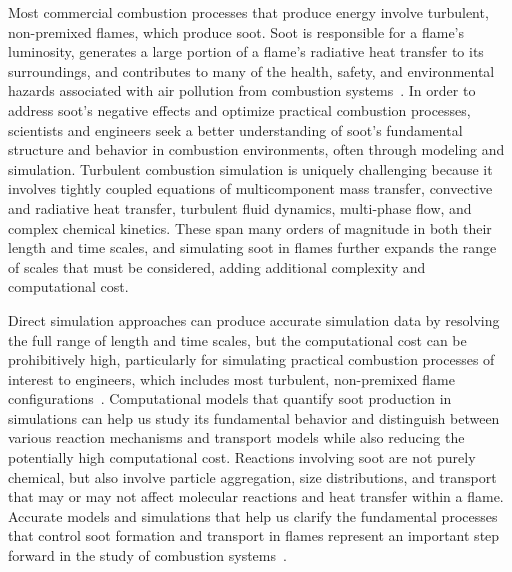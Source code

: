 \documentclass[preprint,letterpaper]{elsarticle}
\begin{document}
Most commercial combustion processes that produce energy involve turbulent, non-premixed flames, which produce soot. Soot is responsible for a flame's luminosity, generates a large portion of a flame's radiative heat transfer to its surroundings, and contributes to many of the health, safety, and environmental hazards associated with air pollution from combustion systems~\cite{EPA_2009,EPA_2004}. In order to address soot's negative effects and optimize practical combustion processes, scientists and engineers seek a better understanding of soot's fundamental structure and behavior in combustion environments, often through modeling and simulation.
Turbulent combustion simulation is uniquely challenging because it involves tightly coupled equations of multicomponent mass transfer, convective and radiative heat transfer, turbulent fluid dynamics, multi-phase flow, and complex chemical kinetics. These span many orders of magnitude in both their length and time scales, and simulating soot in flames further expands the range of scales that must be considered, adding additional complexity and computational cost.

Direct simulation approaches can produce accurate simulation data by resolving the full range of length and time scales, but the computational cost can be prohibitively high, particularly for simulating practical combustion processes of interest to engineers, which includes most turbulent, non-premixed flame configurations~\cite{Pope_2000}.
Computational models that quantify soot production in simulations can help us study its fundamental behavior and distinguish between various reaction mechanisms and transport models while also reducing the potentially high computational cost. Reactions involving soot are not purely chemical, but also involve particle aggregation, size distributions, and transport that may or may not affect molecular reactions and heat transfer within a flame. Accurate models and simulations that help us clarify the fundamental processes that control soot formation and transport in flames represent an important step forward in the study of combustion systems~\cite{Frenklach_2002b}.
\end{document}
